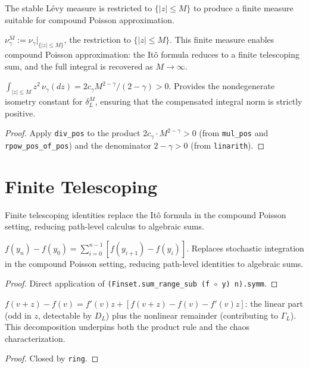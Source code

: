 The stable L\'evy measure is restricted to $\{|z| \leq M\}$ to produce a finite measure suitable for compound Poisson approximation.

\begin{defn}\label{def:trunc_measure}
\leanok
$\nu_\gamma^M := \nu_\gamma|_{\{|z|\leq M\}}$, the restriction to $\{|z| \leq M\}$.
This finite measure enables compound Poisson approximation: the Itô formula
reduces to a finite telescoping sum, and the full integral is recovered as $M \to \infty$.
\end{defn}

\begin{theorem}\label{thm:trunc_second}
\leanok
{}
$\int_{|z|\leq M} z^2\,\nu_\gamma(dz) = 2c_\gamma M^{2-\gamma}/(2-\gamma) > 0$.
Provides the nondegenerate isometry constant for $\delta_L^M$, ensuring that the compensated integral norm is strictly positive.
\end{theorem}
\begin{proof}\leanok Apply \texttt{div\_pos} to the product $2c_\gamma \cdot M^{2-\gamma} > 0$ (from \texttt{mul\_pos} and \texttt{rpow\_pos\_of\_pos}) and the denominator $2 - \gamma > 0$ (from \texttt{linarith}).\end{proof}

\section{Finite Telescoping}

Finite telescoping identities replace the It\^o formula in the compound Poisson setting, reducing path-level calculus to algebraic sums.

\begin{theorem}\label{thm:telescope}
\leanok
$f(y_n) - f(y_0) = \sum_{i=0}^{n-1} [f(y_{i+1}) - f(y_i)]$.
Replaces stochastic integration in the compound Poisson setting, reducing path-level identities to algebraic sums.
\end{theorem}
\begin{proof}\leanok Direct application of \texttt{(Finset.sum\_range\_sub (f $\circ$ y) n).symm}.\end{proof}

\begin{theorem}\label{thm:jump_decomp}
\leanok
$f(v+z) - f(v) = f'(v)z + [f(v+z) - f(v) - f'(v)z]$: the linear part (odd in $z$,
detectable by $D_L$) plus the nonlinear remainder (contributing to $\Gamma_L$).
This decomposition underpins both the product rule and the chaos characterization.
\end{theorem}
\begin{proof}\leanok Closed by \texttt{ring}.\end{proof}


